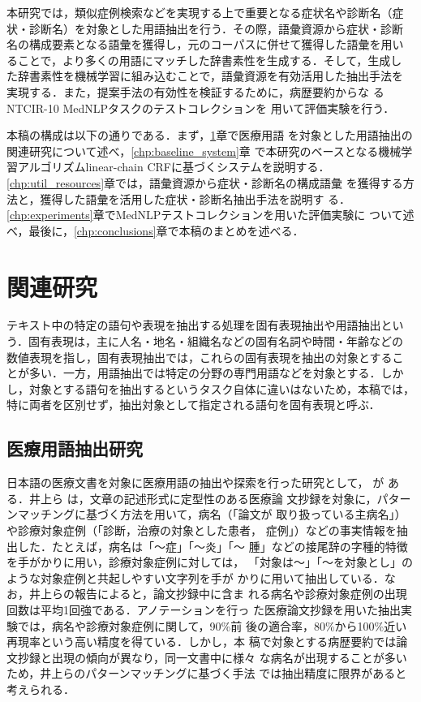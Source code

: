 \documentclass[japanese]{jnlp_1.4}
\begin{document}
本研究では，類似症例検索などを実現する上で重要となる症状名や診断名（症
状・診断名）を対象とした用語抽出を行う．その際，語彙資源から症状・診断
名の構成要素となる語彙を獲得し，元のコーパスに併せて獲得した語彙を用い
ることで，より多くの用語にマッチした辞書素性を生成する．そして，生成し
た辞書素性を機械学習に組み込むことで，語彙資源を有効活用した抽出手法を
実現する．また，提案手法の有効性を検証するために，病歴要約からな
るNTCIR-10 MedNLPタスク\cite{morita2013overview}のテストコレクションを
用いて評価実験を行う．

本稿の構成は以下の通りである．まず，\ref{chp:related_work}章で医療用語
を対象とした用語抽出の関連研究について述べ，\ref{chp:baseline_system}章
で本研究のベースとなる機械学習アルゴリズムlinear-chain CRFに基づくシステムを説明する．
\ref{chp:util_resources}章では，語彙資源から症状・診断名の構成語彙
を獲得する方法と，獲得した語彙を活用した症状・診断名抽出手法を説明す
る．\ref{chp:experiments}章でMedNLPテストコレクションを用いた評価実験に
ついて述べ，最後に，\ref{chp:conclusions}章で本稿のまとめを述べる．


\section{関連研究} \label{chp:related_work}
\vspace{-0.5\Cvs}

テキスト中の特定の語句や表現を抽出する処理を固有表現抽出や用語抽出とい
う．固有表現は，主に人名・地名・組織名などの固有名詞や時間・年齢などの
数値表現を指し，固有表現抽出では，これらの固有表現を抽出の対象とするこ
とが多い．一方，用語抽出では特定の分野の専門用語などを対象とする．しか
し，対象とする語句を抽出するというタスク自体に違いはないため，本稿では，
特に両者を区別せず，抽出対象として指定される語句を固有表現と呼ぶ．


\subsection{医療用語抽出研究}

日本語の医療文書を対象に医療用語の抽出や探索を行った研究として，
\pagebreak
\cite{inoue2001iryo,kinami2008kango,uesugi2007n-gram}が
ある．井上ら\cite{inoue2001iryo} は，文章の記述形式に定型性のある医療論
文抄録を対象に，パターンマッチングに基づく方法を用いて，病名（「論文が
取り扱っている主病名」）や診療対象症例（「診断，治療の対象とした患者，
症例」）などの事実情報を抽出した．たとえば，病名は「〜症」「〜炎」「〜
腫」などの接尾辞の字種的特徴を手がかりに用い，診療対象症例に対しては，
「対象は〜」「〜を対象とし」のような対象症例と共起しやすい文字列を手が
かりに用いて抽出している．なお，井上らの報告によると，論文抄録中に含ま
れる病名や診療対象症例の出現回数は平均1回強である．アノテーションを行っ
た医療論文抄録を用いた抽出実験では，病名や診療対象症例に関して，90\%前
後の適合率，80\%から100\%近い再現率という高い精度を得ている．しかし，本
稿で対象とする病歴要約では論文抄録と出現の傾向が異なり，同一文書中に様々
な病名が出現することが多いため，井上らのパターンマッチングに基づく手法
では抽出精度に限界があると考えられる．
\end{document}
